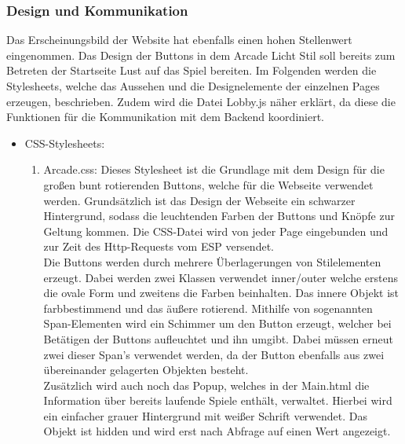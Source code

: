 \documentclass[12pt,a4paper]{article}
\begin{document}
\subsubsection{Design und Kommunikation}
Das Erscheinungsbild der Website hat ebenfalls einen hohen Stellenwert eingenommen. Das Design der Buttons in dem Arcade Licht Stil soll bereits zum Betreten der Startseite Lust auf das Spiel bereiten. Im Folgenden werden die Stylesheets, welche das Aussehen und die Designelemente der einzelnen Pages erzeugen, beschrieben. Zudem wird die Datei \glqq Lobby.js\grqq{} näher erklärt, da diese die Funktionen für die Kommunikation mit dem Backend koordiniert.  
\begin{itemize}
\item{CSS-Stylesheets:}
\begin{enumerate}
	\item Arcade.css: Dieses Stylesheet ist die Grundlage mit dem Design für die großen bunt rotierenden Buttons, welche für die Webseite verwendet werden. Grundsätzlich ist das Design der Webseite ein schwarzer Hintergrund, sodass die leuchtenden Farben der Buttons und Knöpfe zur Geltung kommen. Die CSS-Datei wird von jeder Page eingebunden und zur Zeit des Http-Requests vom ESP versendet.
\vspace{1.5ex}\\
Die Buttons werden durch mehrere Überlagerungen von Stilelementen erzeugt. Dabei werden zwei Klassen verwendet \glqq inner/outer\grqq{} welche erstens die ovale Form und zweitens die Farben beinhalten. Das innere Objekt ist farbbestimmend und das äußere rotierend. Mithilfe von sogenannten \glqq Span\grqq{}-Elementen wird ein Schimmer um den Button erzeugt, welcher bei Betätigen der Buttons aufleuchtet und ihn umgibt. Dabei müssen erneut zwei dieser Span's verwendet werden, da der Button ebenfalls aus zwei übereinander gelagerten Objekten besteht.
\vspace{1.5ex}\\
Zusätzlich wird auch noch das Popup, welches in der Main.html die Information über bereits laufende Spiele enthält, verwaltet. Hierbei wird ein einfacher grauer Hintergrund mit weißer Schrift verwendet. Das Objekt ist \glqq hidden\grqq{} und wird erst nach Abfrage auf einen Wert angezeigt. 
	

\end{enumerate}
\end{itemize}
\end{document}
